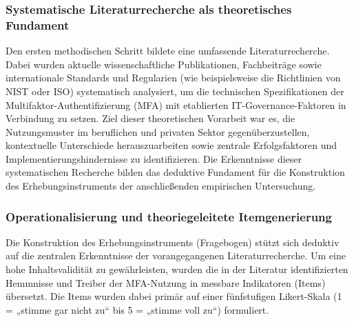 \subsubsection{Systematische Literaturrecherche als theoretisches Fundament}
Den ersten methodischen Schritt bildete eine umfassende Literaturrecherche. Dabei wurden aktuelle wissenschaftliche Publikationen, Fachbeiträge sowie internationale Standards und Regularien (wie beispielsweise die Richtlinien von NIST oder ISO) systematisch analysiert, um die technischen Spezifikationen der Multifaktor-Authentifizierung (MFA) mit etablierten IT-Governance-Faktoren in Verbindung zu setzen. 
Ziel dieser theoretischen Vorarbeit war es, die Nutzungsmuster im beruflichen und privaten Sektor gegenüberzustellen, kontextuelle Unterschiede herauszuarbeiten sowie zentrale Erfolgsfaktoren und Implementierungshindernisse zu identifizieren. Die Erkenntnisse dieser systematischen Recherche bilden das deduktive Fundament für die Konstruktion des Erhebungsinstruments der anschließenden empirischen Untersuchung.

\subsubsection{Operationalisierung und theoriegeleitete Itemgenerierung}
Die Konstruktion des Erhebungsinstruments (Fragebogen) stützt sich deduktiv auf die zentralen Erkenntnisse der vorangegangenen Literaturrecherche. Um eine hohe Inhaltsvalidität zu gewährleisten, wurden die in der Literatur identifizierten Hemmnisse und Treiber der MFA-Nutzung in messbare Indikatoren (Items) übersetzt. Die Items wurden dabei primär auf einer fünfstufigen Likert-Skala (1 = „stimme gar nicht zu“ bis 5 = „stimme voll zu“) formuliert.

